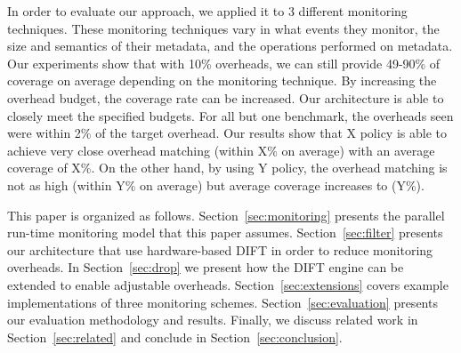 In order to evaluate our approach, we applied it to 3 different monitoring
techniques. These monitoring techniques vary in what events they monitor, the
size and semantics of their metadata, and the operations performed on metadata.
Our experiments show that with 10\% overheads, we can still provide 49-90\% of
coverage on average depending on the monitoring technique. By increasing the
overhead budget, the coverage rate can be increased. Our architecture is able
to closely meet the specified budgets. For all but one benchmark, the overheads
seen were within 2\% of the target overhead. Our results show that X policy is
able to achieve very close overhead matching (within X\% on average) with an
average coverage of X\%. On the other hand, by using Y policy, the overhead
matching is not as high (within Y\% on average) but average coverage increases
to (Y\%).

This paper is organized as follows. Section~\ref{sec:monitoring} presents the
parallel run-time monitoring model that this paper assumes.
Section~\ref{sec:filter} presents our architecture that use hardware-based DIFT
in order to reduce monitoring overheads. In Section~\ref{sec:drop} we present
how the DIFT engine can be extended to enable adjustable overheads.
Section~\ref{sec:extensions} covers example implementations of three monitoring
schemes. Section~\ref{sec:evaluation} presents our evaluation methodology and
results. Finally, we discuss related work in Section~\ref{sec:related} and
conclude in Section~\ref{sec:conclusion}.

